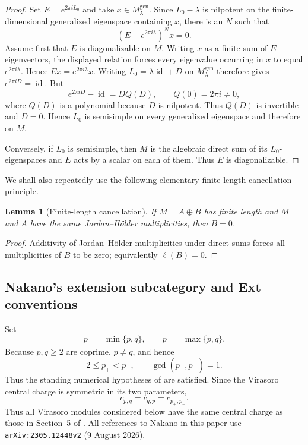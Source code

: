 \documentclass[12pt,leqno]{amsart}
\numberwithin{equation}{section}
\newtheorem{lem}[thm]{Lemma}
\newcommand{\id}{\operatorname{id}}
\begin{document}
\begin{proof}
Set $E=e^{2\pi iL_0}$ and take
$x\in M^{\mathrm{gen}}_\lambda$.  Since $L_0-\lambda$ is nilpotent on
the finite-dimensional generalized eigenspace containing $x$, there is an
$N$ such that
\[
 (E-e^{2\pi i\lambda})^N x=0.
\]
Assume first that $E$ is diagonalizable on $M$.  Writing $x$ as a finite
sum of $E$-eigenvectors, the displayed relation forces every eigenvalue
occurring in $x$ to equal $e^{2\pi i\lambda}$.  Hence
$Ex=e^{2\pi i\lambda}x$.  Writing
$L_0=\lambda\id+D$ on $M^{\mathrm{gen}}_\lambda$ therefore gives
$e^{2\pi iD}=\id$.  But
\[
 e^{2\pi iD}-\id=DQ(D),
 \qquad Q(0)=2\pi i\ne0,
\]
where $Q(D)$ is a polynomial because $D$ is nilpotent.  Thus $Q(D)$ is
invertible and $D=0$.  Hence $L_0$ is semisimple on every generalized
eigenspace and therefore on $M$.

Conversely, if $L_0$ is semisimple, then $M$ is the algebraic direct sum
of its $L_0$-eigenspaces and $E$ acts by a scalar on each of them.  Thus
$E$ is diagonalizable.
\end{proof}

We shall also repeatedly use the following elementary finite-length
cancellation principle.

\begin{lem}[Finite-length cancellation]\label{lem:length-cancellation}
If $M=A\oplus B$ has finite length and $M$ and $A$ have the same
Jordan--H\"older multiplicities, then $B=0$.
\end{lem}

\begin{proof}
Additivity of Jordan--H\"older multiplicities under direct sums forces all
multiplicities of $B$ to be zero; equivalently $\ell(B)=0$.
\end{proof}

\subsection{Nakano's extension subcategory and Ext conventions}

Set
\[
 p_+=\min\{p,q\},\qquad p_-=\max\{p,q\}.
\]
Because $p,q\ge2$ are coprime, $p\ne q$, and hence
\[
 2\le p_+<p_-,\qquad \gcd(p_+,p_-)=1.
\]
Thus the standing numerical hypotheses of \cite{Nakano} are satisfied.
Since the Virasoro central charge is symmetric in its two parameters,
\begin{equation}\label{eq:central-charge-symmetry}
 c_{p,q}=c_{q,p}=c_{p_+,p_-}.
\end{equation}
Thus all Virasoro modules considered below have the same central charge as
those in Section~5 of \cite{Nakano}.  All references to Nakano in this paper
use \nolinkurl{arXiv:2305.12448v2} (9 August 2026).
\end{document}
